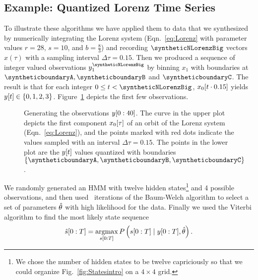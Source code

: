 \subsection{Example: Quantized Lorenz Time Series}
\label{sec:QuantizedLorenz}

To illustrate these algorithms we have applied them to data that we
synthesized by numerically integrating the Lorenz system
(Eqn.~\eqref{eq:Lorenz} with parameter values $r=28$, $s=10$, and
$b=\frac{8}{3}$) and recording $\syntheticNLorenzBig$ vectors
$x(\tau)$ with a sampling interval $\Delta \tau = 0.15$.  Then we
produced a sequence of integer valued observations  $y_1^{\syntheticNLorenzBig}$ by binning $x_1$
with boundaries at $\syntheticboundaryA,\syntheticboundaryB$ and
$\syntheticboundaryC$.  The result is that for each integer
$0\leq t < \syntheticNLorenzBig$, ${x_0}{[t\cdot0.15]}$ yields
${y}{[t]} \in \left\{0,1,2,3\right\}$.  Figure~\ref{fig:TSintro}
depicts the first few observations.

\begin{figure}[htbp]
  \caption[Generating the observations
  $\ts{y}{0}{40}$.]%
  {Generating the observations $\ts{y}{0}{40}$.  The curve in the
    upper plot depicts the first component ${x_0}{[\tau]}$ of an
    orbit of the Lorenz system (Eqn.~\ref{eq:Lorenz}), and the points
    marked with red dots indicate the values sampled with an interval
    $\Delta \tau = 0.15$.  The points in the lower plot are the
    ${y}{[t]}$ values quantized with boundaries
    $\left\{\syntheticboundaryA, \syntheticboundaryB, \syntheticboundaryC\right\}$.  }
  \label{fig:TSintro} 
\end{figure}
 
We randomly generated an HMM with twelve hidden states\footnote{We
  chose the number of hidden states to be twelve capriciously so that
  we could organize Fig.~\ref{fig:Statesintro} on a $4\times 4$ grid.}
and 4 possible observations, and then used \syntheticLorenzTrainingIterations
~iterations of the Baum-Welch algorithm to select a set of parameters
$\hat {\theta}$ with high likelihood for the data.  Finally we used
the Viterbi algorithm to find the most likely state sequence
 \begin{equation*}
   {\hat s[0:T]} = \operatorname*{argmax}_{s[0:T]}P
   \left(s[0:T]\mid y[0:T], \hat {\theta} \right).
 \end{equation*}
 
